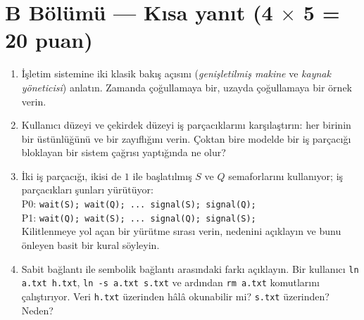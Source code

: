 \documentclass[11pt,a4paper]{article}
\newcommand{\cmd}[1]{\texttt{#1}}
\begin{document}
\section*{B Bölümü --- Kısa yanıt \hfill (4 $\times$ 5 = 20 puan)}
\begin{enumerate}[leftmargin=2.0em,label=B\arabic*.,itemsep=0.3em]
  \item İşletim sistemine iki klasik bakış açısını (\emph{genişletilmiş makine} ve \emph{kaynak yöneticisi}) anlatın. Zamanda çoğullamaya bir, uzayda çoğullamaya bir örnek verin. 
  \ans{2.7cm}
  \item Kullanıcı düzeyi ve çekirdek düzeyi iş parçacıklarını karşılaştırın: her birinin bir üstünlüğünü ve bir zayıflığını verin. Çoktan bire modelde bir iş parçacığı bloklayan bir sistem çağrısı yaptığında ne olur? 
  \ans{2.7cm}
  \item İki iş parçacığı, ikisi de $1$ ile başlatılmış $S$ ve $Q$ semaforlarını kullanıyor; iş parçacıkları şunları yürütüyor:\\[0.2em]
  \hspace*{1em}P0: \texttt{wait(S); wait(Q); ... signal(S); signal(Q);}\\
  \hspace*{1em}P1: \texttt{wait(Q); wait(S); ... signal(Q); signal(S);}\\[0.2em]
  Kilitlenmeye yol açan bir yürütme sırası verin, nedenini açıklayın ve bunu önleyen basit bir kural söyleyin. 
  \ans{2.7cm}
  \item Sabit bağlantı ile sembolik bağlantı arasındaki farkı açıklayın. Bir kullanıcı \cmd{ln a.txt h.txt}, \cmd{ln -s a.txt s.txt} ve ardından \cmd{rm a.txt} komutlarını çalıştırıyor. Veri \texttt{h.txt} üzerinden hâlâ okunabilir mi? \texttt{s.txt} üzerinden? Neden? 
  \ans{2.7cm}
\end{enumerate}

\newpage
\end{document}

